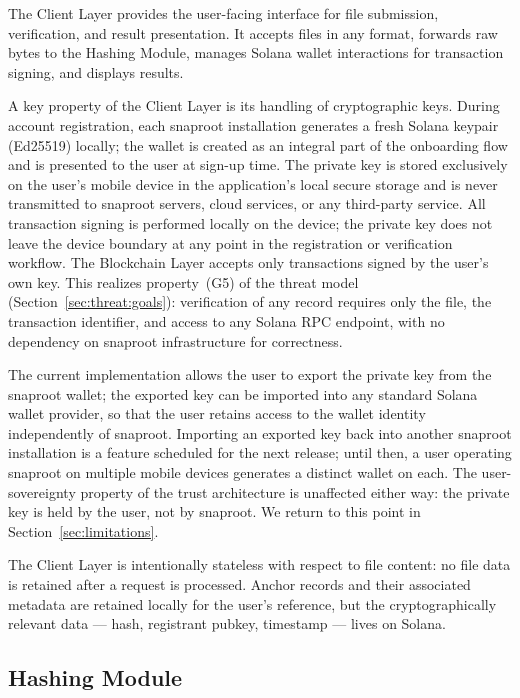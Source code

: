 \documentclass[11pt,a4paper]{article}
\begin{document}
The Client Layer provides the user-facing interface for file submission,
verification, and result presentation. It accepts files in any format,
forwards raw bytes to the Hashing Module, manages Solana wallet
interactions for transaction signing, and displays results.

A key property of the Client Layer is its handling of cryptographic
keys. During account registration, each snaproot installation generates
a fresh Solana keypair (Ed25519) locally; the wallet is created as an
integral part of the onboarding flow and is presented to the user at
sign-up time. The private key is stored exclusively on the user's mobile device
in the application's local secure storage and is never transmitted to
snaproot servers, cloud services, or any third-party service. All
transaction signing is performed locally on the device; the private
key does not leave the device boundary at any point in the
registration or verification workflow. The Blockchain Layer accepts
only transactions signed by the user's own key. This realizes property~(G5) of the threat model
(Section~\ref{sec:threat:goals}): verification of any record requires
only the file, the transaction identifier, and access to any Solana
RPC endpoint, with no dependency on snaproot infrastructure for
correctness.

The current implementation allows the user to export the private key
from the snaproot wallet; the exported key can be imported into any
standard Solana wallet provider, so that the user retains access to
the wallet identity independently of snaproot. Importing an exported
key back into another snaproot installation is a feature scheduled for
the next release; until then, a user operating snaproot on multiple
mobile devices generates a distinct wallet on each. The user-sovereignty
property of the trust architecture is unaffected either way: the private
key is held by the user, not by snaproot. We return to this point in
Section~\ref{sec:limitations}.

The Client Layer is intentionally stateless with respect to file
content: no file data is retained after a request is processed. Anchor
records and their associated metadata are retained locally for the
user's reference, but the cryptographically relevant data --- hash,
registrant pubkey, timestamp --- lives on Solana.

\subsection{Hashing Module}
\label{sec:architecture:hashing}
\end{document}

